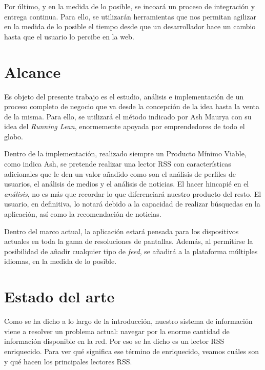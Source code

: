 Por último, y en la medida de lo posible, se incoará un proceso de integración y entrega continua. Para ello, se utilizarán herramientas que nos permitan agilizar en la medida de lo posible el tiempo desde que un desarrollador hace un cambio hasta que el usuario lo percibe en la web.


\section{Alcance}\label{sec:alcance}

Es objeto del presente trabajo es el estudio, análisis e implementación de un proceso completo de negocio que va desde la concepción de la idea hasta la venta de la misma. Para ello, se utilizará el método indicado por Ash Maurya con su idea del \textit{Running Lean}, enormemente apoyada por emprendedores de todo el globo.

Dentro de la implementación, realizado siempre un Producto Mínimo Viable, como indica Ash, se pretende realizar una lector RSS con características adicionales que le den un valor añadido como son el análisis de perfiles de usuarios, el análisis de medios y el análisis de noticias. El hacer hincapié en el \textit{análisis}, no es más que recordar lo que diferenciará nuestro producto del resto. El usuario, en definitiva, lo notará debido a la capacidad de realizar búsquedas en la aplicación, así como la recomendación de noticias.

Dentro del marco actual, la aplicación estará pensada para los dispositivos actuales en toda la gama de resoluciones de pantallas. Además, al permitirse la posibilidad de añadir cualquier tipo de \textit{feed}, se añadirá a la plataforma múltiples idiomas, en la medida de lo posible.


\section{Estado del arte}\label{sec:arte}

Como se ha dicho a lo largo de la introducción, nuestro sistema de información viene a resolver un problema actual: navegar por la enorme cantidad de información disponible en la red. Por eso se ha dicho es un lector RSS enriquecido. Para ver qué significa ese término de enriquecido, veamos cuáles son y qué hacen los principales lectores RSS.


 
